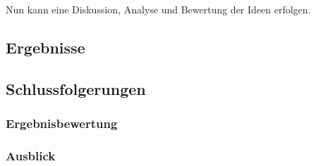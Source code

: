 Nun kann eine Diskussion, Analyse und Bewertung der Ideen erfolgen.

\newpage



\newpage


\newpage


\newpage


\subsection{Ergebnisse}

\subsection{Schlussfolgerungen}
\subsubsection{Ergebnisbewertung}
\subsubsection{Ausblick}